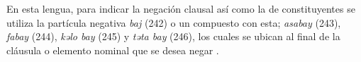 En esta lengua, para indicar la negación clausal así como la de constituyentes se utiliza la partícula negativa {\setmainfont{Charis SIL} \textit{baj}} (242) o un compuesto con esta; {\setmainfont{Charis SIL} \textit{asabay}} (243), {\setmainfont{Charis SIL} \textit{fabay}} (244), {\setmainfont{Charis SIL} \textit{kəlo bay}} (245) y {\setmainfont{Charis SIL} \textit{təta bay}} (246), los cuales se ubican al final de la cláusula o elemento nominal que se desea negar \textcolor{MidnightBlue}{\citep{moloko}}.